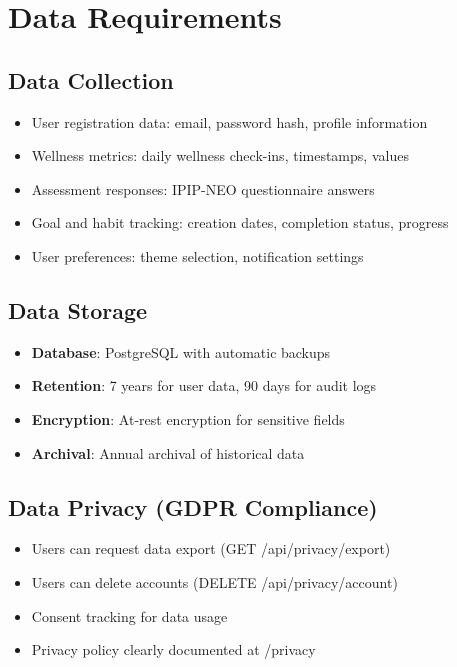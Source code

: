 \documentclass[12pt,a4paper]{article}
\begin{document}
\newpage
\section{Data Requirements}

\subsection{Data Collection}
\begin{itemize}
    \item User registration data: email, password hash, profile information
    \item Wellness metrics: daily wellness check-ins, timestamps, values
    \item Assessment responses: IPIP-NEO questionnaire answers
    \item Goal and habit tracking: creation dates, completion status, progress
    \item User preferences: theme selection, notification settings
\end{itemize}

\subsection{Data Storage}
\begin{itemize}
    \item \textbf{Database}: PostgreSQL with automatic backups
    \item \textbf{Retention}: 7 years for user data, 90 days for audit logs
    \item \textbf{Encryption}: At-rest encryption for sensitive fields
    \item \textbf{Archival}: Annual archival of historical data
\end{itemize}

\subsection{Data Privacy (GDPR Compliance)}
\begin{itemize}
    \item Users can request data export (GET /api/privacy/export)
    \item Users can delete accounts (DELETE /api/privacy/account)
    \item Consent tracking for data usage
    \item Privacy policy clearly documented at /privacy
\end{itemize}
\end{document}
